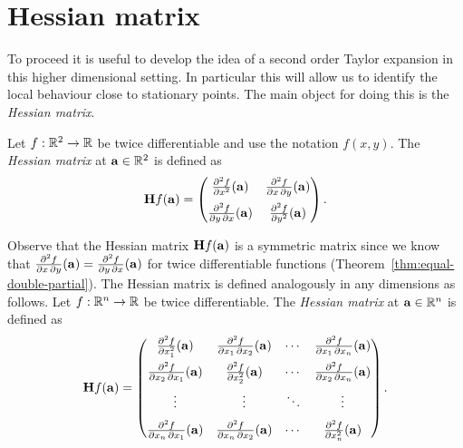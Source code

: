 \section{Hessian matrix}

To proceed it is useful to develop the idea of a second order Taylor expansion in this higher dimensional setting.
In particular this will allow us to identify the local behaviour close to stationary points.
The main object for doing this is the \emph{Hessian matrix}.

\begin{definition}
    Let \(f:\bR^2 \to\bR\) be twice differentiable and use the notation \(f(x,y)\).
    The \emph{Hessian matrix} at \(\aa\in \bR^2\) is defined as
    \[
        \mathbf{H} f (\aa)= \begin{pmatrix}
            \frac{\partial^2 f}{\partial x^2} (\aa)
             & \frac{\partial^2 f}{\partial x\,\partial y} (\aa)
            \\[1.5ex]
            \frac{\partial^2 f}{\partial y\,\partial x} (\aa)
             & \frac{\partial^2 f}{\partial y^2}(\aa)
        \end{pmatrix}.
    \]
\end{definition}

Observe that the Hessian matrix \(\mathbf{H} f (\aa)\) is a symmetric matrix since we know that \(\frac{\partial^2 f}{\partial x\,\partial y} (\aa) = \frac{\partial^2 f}{\partial y\,\partial x} (\aa)\) for twice differentiable functions (Theorem~\ref{thm:equal-double-partial}).
The Hessian matrix is defined analogously in any dimensions as follows.
Let \(f:\bR^n \to\bR\) be twice differentiable.
The \emph{Hessian matrix} at \(\aa\in \bR^n\) is defined as
\[
    \mathbf{H} f (\aa)= \begin{pmatrix}
        \frac{\partial^2 f}{\partial x_1^2} (\aa)
         & \frac{\partial^2 f}{\partial x_1\,\partial x_2} (\aa)
         & \cdots
         & \frac{\partial^2 f}{\partial x_1\,\partial x_n}(\aa)  \\[1.5ex]
        \frac{\partial^2 f}{\partial x_2\,\partial x_1} (\aa)
         & \frac{\partial^2 f}{\partial x_2^2}(\aa)
         & \cdots
         & \frac{\partial^2 f}{\partial x_2\,\partial x_n}(\aa)  \\[1.5ex]
        \vdots
         & \vdots
         & \ddots
         & \vdots                                                \\[1.5ex]
        \frac{\partial^2 f}{\partial x_n\,\partial x_1} (\aa)
         & \frac{\partial^2 f}{\partial x_n\,\partial x_2} (\aa)
         & \cdots
         & \frac{\partial^2 f}{\partial x_n^2}(\aa)
    \end{pmatrix}.
\]

